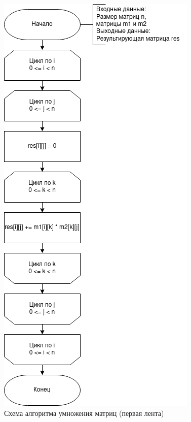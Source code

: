 \begin{figure}[H]
	\begin{center}
		\includegraphics[scale=0.6]{assets/mult.png}
	\end{center}
	\caption{Схема алгоритма умножения матриц (первая лента)}
\end{figure}

